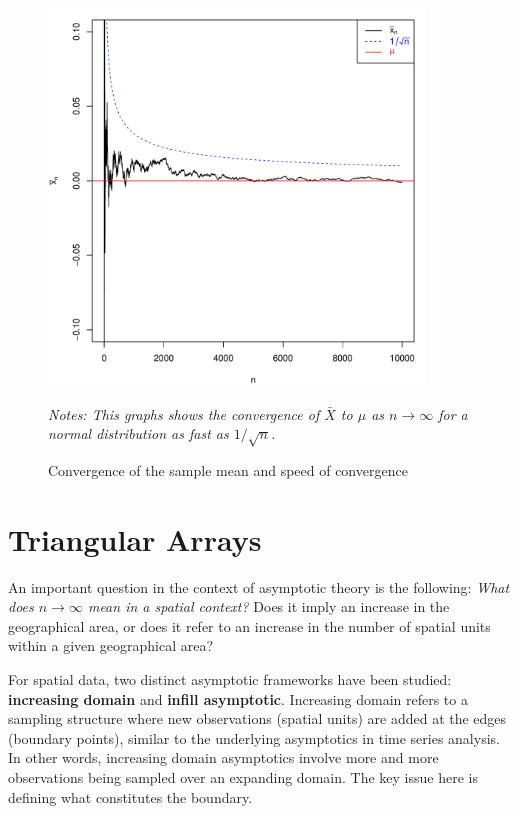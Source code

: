 \documentclass[english,12pt]{book}\usepackage[]{graphicx}\usepackage[]{xcolor}
\newenvironment{knitrout}{}{} %
\begin{document}
\begin{figure}[H]
  \caption{Convergence of the sample mean and speed of convergence}
    \label{fig:Op_example}
        \centering
    \begin{minipage}{.9\linewidth}
\begin{knitrout}
\color{fgcolor}

{\centering \includegraphics[width=10cm,height=10cm]{figure/CLT-normalplot-bigO-1} 

}


\end{knitrout}
\footnotesize
		\emph{Notes: This graphs shows the convergence of $\bar{X}$ to $\mu$ as $n\to\infty$ for a normal distribution as fast as $1/\sqrt{n}$.}
	\end{minipage}
\end{figure}

\section{Triangular Arrays}\label{sec:triangular-array}

An important question in the context of asymptotic theory is the following: \emph{What does $n \to \infty$ mean in a spatial context?} Does it imply an increase in the geographical area, or does it refer to an increase in the number of spatial units within a given geographical area?

For spatial data, two distinct asymptotic frameworks have been studied: \textbf{increasing domain} and \textbf{infill asymptotic}. Increasing domain refers to a sampling structure where new observations (spatial units) are added at the edges (boundary points), similar to the underlying asymptotics in time series analysis. In other words, increasing domain asymptotics involve more and more observations being sampled over an expanding domain. The key issue here is defining what constitutes the boundary.
\end{document}
